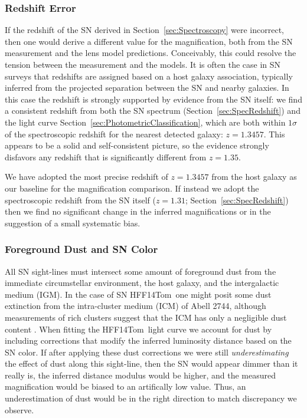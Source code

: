 \documentclass[iop]{emulateapj}
\def\tomas{HFF14Tom}
\begin{document}
\subsubsection{Redshift Error}
\label{sec:RedshiftError}

If the redshift of the SN derived in Section~\ref{sec:Spectroscopy}
were incorrect, then one would derive a different value for the
magnification, both from the SN measurement and the lens model
predictions.  Conceivably, this could resolve the tension between the
measurement and the models.  It is often the case in SN surveys that
redshifts are assigned based on a host galaxy association, typically
inferred from the projected separation between the SN and nearby
galaxies.  In this case the redshift is strongly supported by
evidence from the SN
itself: we find a consistent redshift from both the SN spectrum
(Section~\ref{sec:SpecRedshift}) and the light curve
Section~\ref{sec:PhotometricClassification}, which are both within
$1\sigma$ of the spectroscopic redshift for the nearest detected
galaxy: $z=1.3457$. This appears to be a solid and self-consistent
picture, so the evidence strongly disfavors any redshift that is
significantly different from $z=1.35$.

We have adopted the most precise redshift of $z=1.3457$ from
the host galaxy as our baseline for the magnification comparison.  If
instead we adopt the spectroscopic redshift from the SN itself
($z=1.31$; Section~\ref{sec:SpecRedshift}) then we find no significant
change in the inferred magnifications or in the suggestion of a small
systematic bias.


\subsubsection{Foreground Dust and SN Color}
\label{sec:ForegroundDust}

All SN sight-lines must intersect some amount of foreground dust from
the immediate circumstellar environment, the host galaxy, and the
intergalactic medium (IGM). In the case of SN \tomas\ one might posit
some dust extinction from the intra-cluster medium (ICM) of Abell
2744, although measurements of rich clusters suggest that the ICM has
only a negligible dust
content \citep{Maoz:1995,Stickel:2002,Bai:2007}.  When fitting
the \tomas\ light curve we account for dust by including corrections
that modify the inferred luminosity distance based on the SN color.
If after applying these dust corrections we were still {\it
underestimating} the effect of dust along this sight-line, then the SN
would appear dimmer than it really is, the inferred distance modulus would be higher,
and the measured magnification would be biased to an artifically low
value. Thus, an underestimation of dust would be in the right
direction to match discrepancy we observe.
\end{document}
